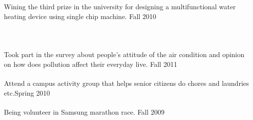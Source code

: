 \documentclass[11pt]{article} %
\begin{document}
\\
\\
Wining the third prize in the university for designing a multifunctional water heating device using single chip machine. \hfill Fall 2010
\\
\\
\\
\\
Took part in the survey about people's attitude of the air condition and opinion on how does pollution affect their everyday live. \hfill Fall 2011
\\
\\
Attend a campus activity group that helps senior citizens do chores and laundries etc.\hfill Spring 2010
\\
\\
Being volunteer in Samsung marathon race. \hfill Fall 2009
\end{document}
